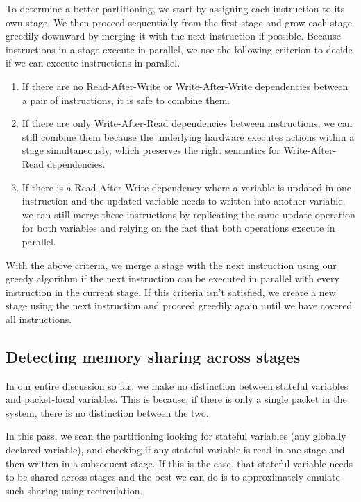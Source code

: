 To determine a better partitioning, we start by assigning each instruction to
its own stage. We then proceed sequentially from the first stage and grow each
stage greedily downward by merging it with the next instruction if possible.
Because instructions in a stage execute in parallel, we use the following
criterion to decide if we can execute instructions in parallel.
\begin{enumerate}
\item If there are no Read-After-Write or Write-After-Write dependencies
between a pair of instructions, it is safe to combine them.
\item If there are only Write-After-Read dependencies between instructions, we
can still combine them because the underlying hardware executes actions within
a stage simultaneously, which preserves the right semantics for
Write-After-Read dependencies.

\item If there is a Read-After-Write dependency where a variable is updated in
one instruction and the updated variable needs to written into another
variable, we can still merge these instructions by replicating the same update
operation for both variables and relying on the fact that both operations
execute in parallel.
\end{enumerate}
With the above criteria, we merge a stage with the next instruction using our
greedy algorithm if the next instruction can be executed in parallel with every
instruction in the current stage. If this criteria isn't satisfied, we create a
new stage using the next instruction and proceed greedily again until we have
covered all instructions.

\subsection{Detecting memory sharing across stages}
In our entire discussion so far, we make no distinction between stateful
variables and packet-local variables. This is because, if there is only a
single packet in the system, there is no distinction between the two.

In this pass, we scan the partitioning looking for stateful variables (any
globally declared variable), and checking if any stateful variable is read in
one stage and then written in a subsequent stage. If this is the case, that
stateful variable needs to be shared across stages and the best we can do is to
approximately emulate such sharing using recirculation.

